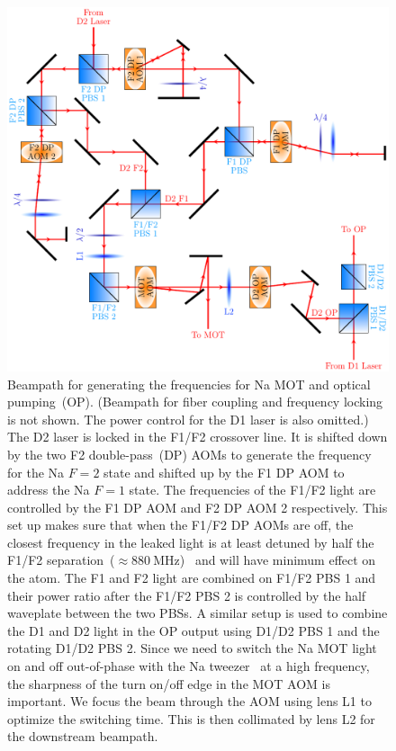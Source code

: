 \begin{figure}
  \centering
  \includegraphics[width=\textwidth]{figures/loading_na_res_beampath.pdf}
  \caption[Beampath for Na D1 and D2 light.]{
    Beampath for generating the frequencies for Na MOT and optical pumping~(OP).
    (Beampath for fiber coupling and frequency locking is not shown.
    The power control for the D1 laser is also omitted.)
    The D2 laser is locked in the F1/F2 crossover line.
    It is shifted down by the two F2 double-pass~(DP) AOMs to generate the frequency
    for the Na $F=2$ state and shifted up by the F1 DP AOM to address the Na $F=1$ state.
    The frequencies of the F1/F2 light are controlled by the F1 DP AOM
    and F2 DP AOM 2 respectively.
    This set up makes sure that when the F1/F2 DP AOMs are off,
    the closest frequency in the leaked light is at least detuned
    by half the F1/F2 separation~($\approx880~\mathrm{MHz}$)~\cite{steck_sodium_2019}
    and will have minimum effect on the atom.
    The F1 and F2 light are combined on F1/F2 PBS 1 and their power ratio after the
    F1/F2 PBS 2 is controlled by the half waveplate between the two PBSs.
    A similar setup is used to combine the D1 and D2 light in the OP output using
    D1/D2 PBS 1 and the rotating D1/D2 PBS 2.
    Since we need to switch the Na MOT light on and off out-of-phase
    with the Na tweezer~\cite{hutzler_eliminating_2017} at a high frequency,
    the sharpness of the turn on/off edge in the MOT AOM is important.
    We focus the beam through the AOM using lens L1 to optimize the switching time.
    This is then collimated by lens L2 for the downstream beampath.
    \label{fig:loading:free-space:na-res-beampath}}
\end{figure}

